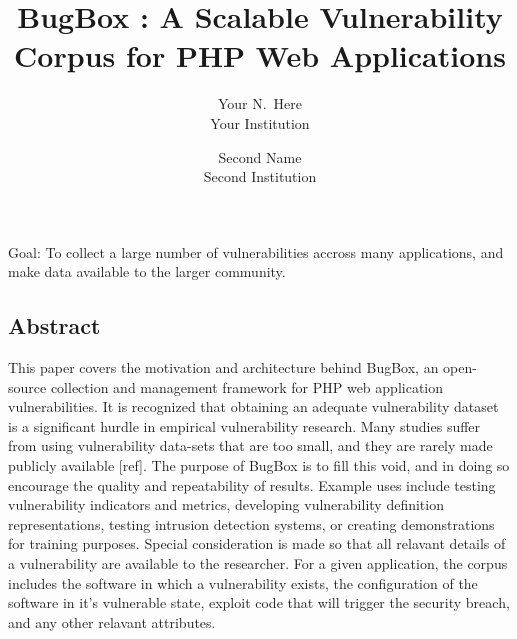 \documentclass[letterpaper,twocolumn,10pt]{article}
\begin{document}
\date{}


\title{\Large \bf BugBox : A Scalable Vulnerability Corpus for PHP Web Applications}


\author{
{\rm Your N.\ Here}\\
Your Institution
\and
{\rm Second Name}\\
Second Institution
} %

\maketitle

\thispagestyle{empty}


Goal:
To collect a large number of vulnerabilities accross many applications, and make data available to the larger community.\\


\subsection*{Abstract}

This paper covers the motivation and architecture behind BugBox, an open-source collection and management framework for PHP web application vulnerabilities. It is recognized that obtaining an adequate vulnerability dataset is a significant hurdle in empirical vulnerability research. Many studies suffer from using vulnerability data-sets that are too small, and they are rarely made publicly available [ref]. The purpose of BugBox is to fill this void, and in doing so encourage the quality and repeatability of results. Example uses include testing vulnerability indicators and metrics, developing vulnerability definition representations, testing intrusion detection systems, or creating demonstrations for training purposes. 
Special consideration is made so that all relavant details of a vulnerability are available to the researcher. For a given application, the corpus includes the software in which a vulnerability exists, the configuration of the software in it's vulnerable state, exploit code that will trigger the security breach, and any other relavant attributes. 
\end{document}
